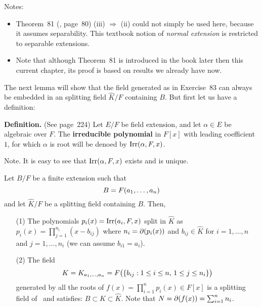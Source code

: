 \begin{myenumerate}
\begin{itemize}
   Notes:
   \begin{itemize}
    \item
      Theorem~81 (\cite{Rotman98}, page~80)  (iii) \(\Rightarrow\) (ii)
      could not simply be used here, because it assumes separability.
      This textbook notion of
      \emph{normal extension} is restricted to separable extensions.
    \item
      Note that although Theorem~81 is introduced in the book later
      then this current chapter, its proof is based on results
      we already have now.
   \end{itemize}

   The next lemma will show that the field generated as in Exercise~83
   can always be embedded in an splitting field \(\hat{K}/F\) containing $B$.
   But first let us have a definition:

   \textbf{Definition.}
   (See \cite{Lang94} page~224)
   Let \(E/F\) be field extension, and let \(\alpha\in E\) be
   algebraic over $F$. The
   \textbf{irreducible polynomial}
    in \(F[x]\) with leading coefficient $1$,
   for which \(\alpha\) is root will be denoed by \(\mathop{\rm Irr}\nolimits(\alpha,F,x)\).

   Note. It is easy to see that \(\mathop{\rm Irr}\nolimits(\alpha,F,x)\) exists and is unique.


   \begin{llem} \label{lem:BF:splitclos}
   Let \(B/F\) be a finite extension such that
   \begin{equation} \label{eq:B:Fa}
   B=F(a_1,\ldots,a_{n})
   \end{equation}
   and let \(\hat{K}/F\)
   be a splitting field containing $B$.
   Then,
   \begin{itemize}
    \item[(1)]
      The polynomials \(p_i(x) = \mathop{\rm Irr}\nolimits(a_i,F,x)\) split in \(\hat{K}\)
      as \(p_i(x) = \prod_{j=1}^{n_i} (x - b_{ij})\) where
      \(n_i = \partial(p_i(x))\) and
      \(b_{ij}\in \hat{K}\) for \(i=1,\ldots,n\) and \(j=1,\ldots,n_i\)
      \textnormal{(we can assume  \(b_{i1}=a_i\))}.
    \item[(2)]
      The field
      \begin{equation} \label{eq:Kaibij}
      K = K_{a_1,\ldots,a_{n}}
        = F\bigl(\{b_{ij}: 1\leq i \leq n,\, 1\leq j \leq n_i\}\bigr)
      \end{equation}
      generated by all the roots of \(f(x)=\prod_{i=1}^n p_i(x) \in F[x]\)
      is a splitting field of \px\ and
      satisfies:  \(B\subset K \subset \hat{K}\).
      \textnormal{Note that \(N=\partial(f(x))=\sum_{i=1}^n n_i\)}.


\end{itemize}
\end{llem}
\end{itemize}
\end{myenumerate}
